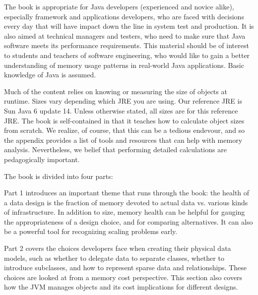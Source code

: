 
The book is appropriate for Java developers (experienced and novice alike), especially framework and applications developers, who are faced with decisions every day that will have impact down the line in system test and production. It is also aimed at technical managers and testers, who need to make sure that Java software meets its performance requirements.  This material should be of interest to students and teachers of software engineering, who would like to gain a better understanding of memory usage patterns in real-world Java applications. Basic knowledge of Java is assumed.

Much of the content relies on knowing or measuring the size of objects at runtime. Sizes vary depending which JRE you are using. Our reference JRE is Sun Java 6 update 14. Unless otherwise stated, all sizes are for this reference JRE. The book is self-contained in that it teaches how to calculate object sizes from scratch. We realize, of course, that this can be a tedious endevour, and so the appendix provides a list of tools and resources that can help with memory analysis. Nevertheless, we belief that performing detailed calculations are pedagogically important. 


The book is divided into four parts:

Part 1 introduces an important theme that runs through the book: the
health of a data design is the fraction of memory devoted to actual data vs. various kinds of infrastructure. In addition to size, memory health can be helpful for gauging the appropriateness of a design choice, and for comparing alternatives. It can also be a powerful tool for recognizing scaling problems early.

Part 2 covers the choices developers face when creating their physical data models, such as whether to delegate data to separate classes, whether to introduce subclasses, and how to represent sparse data and relationships. These choices are looked at from a memory cost perspective. This section also covers how the JVM manages objects and its cost implications for different designs.
  
